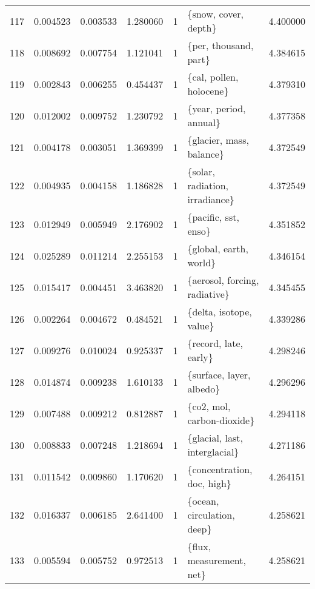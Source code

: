 \begin{tabular}{lrrrrlr}
117 &    0.004523 &  0.003533 &        1.280060 &           1 &                    \{snow, cover, depth\} &  4.400000 \\
118 &    0.008692 &  0.007754 &        1.121041 &           1 &                   \{per, thousand, part\} &  4.384615 \\
119 &    0.002843 &  0.006255 &        0.454437 &           1 &                 \{cal, pollen, holocene\} &  4.379310 \\
120 &    0.012002 &  0.009752 &        1.230792 &           1 &                  \{year, period, annual\} &  4.377358 \\
121 &    0.004178 &  0.003051 &        1.369399 &           1 &                \{glacier, mass, balance\} &  4.372549 \\
122 &    0.004935 &  0.004158 &        1.186828 &           1 &          \{solar, radiation, irradiance\} &  4.372549 \\
123 &    0.012949 &  0.005949 &        2.176902 &           1 &                    \{pacific, sst, enso\} &  4.351852 \\
124 &    0.025289 &  0.011214 &        2.255153 &           1 &                  \{global, earth, world\} &  4.346154 \\
125 &    0.015417 &  0.004451 &        3.463820 &           1 &           \{aerosol, forcing, radiative\} &  4.345455 \\
126 &    0.002264 &  0.004672 &        0.484521 &           1 &                 \{delta, isotope, value\} &  4.339286 \\
127 &    0.009276 &  0.010024 &        0.925337 &           1 &                   \{record, late, early\} &  4.298246 \\
128 &    0.014874 &  0.009238 &        1.610133 &           1 &                \{surface, layer, albedo\} &  4.296296 \\
129 &    0.007488 &  0.009212 &        0.812887 &           1 &              \{co2, mol, carbon-dioxide\} &  4.294118 \\
130 &    0.008833 &  0.007248 &        1.218694 &           1 &           \{glacial, last, interglacial\} &  4.271186 \\
131 &    0.011542 &  0.009860 &        1.170620 &           1 &              \{concentration, doc, high\} &  4.264151 \\
132 &    0.016337 &  0.006185 &        2.641400 &           1 &              \{ocean, circulation, deep\} &  4.258621 \\
133 &    0.005594 &  0.005752 &        0.972513 &           1 &                \{flux, measurement, net\} &  4.258621 \\

\end{tabular}
